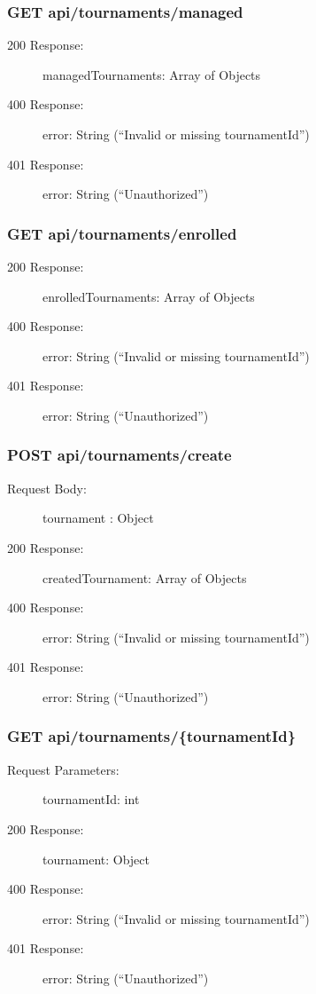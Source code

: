 \documentclass{Configuration_Files/Template}
\begin{document}
\subsubsection{GET api/tournaments/managed}
\begin{description}
    \item[200 Response:] managedTournaments: Array of Objects
    \item[400 Response:] error: String (“Invalid or missing tournamentId”)
    \item[401 Response:] error: String (“Unauthorized”)
\end{description}

\subsubsection{GET api/tournaments/enrolled}
\begin{description}
    \item[200 Response:] enrolledTournaments: Array of Objects
    \item[400 Response:] error: String (“Invalid or missing tournamentId”)
    \item[401 Response:] error: String (“Unauthorized”)
\end{description}

\subsubsection{POST api/tournaments/create}
\begin{description}
    \item[Request Body:] tournament : Object
    \item[200 Response:] createdTournament: Array of Objects
    \item[400 Response:] error: String (“Invalid or missing tournamentId”)
    \item[401 Response:] error: String (“Unauthorized”)
\end{description}

\subsubsection{GET api/tournaments/\{tournamentId\}}
\begin{description}
    \item[Request Parameters:] tournamentId: int
    \item[200 Response:] tournament: Object
    \item[400 Response:] error: String (“Invalid or missing tournamentId”)
    \item[401 Response:] error: String (“Unauthorized”)
\end{description}
\end{document}
